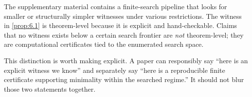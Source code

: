 The supplementary material contains a finite-search pipeline that looks for
smaller or structurally simpler witnesses under various restrictions. The
witness in \cref{prop:6.1} is theorem-level because it is explicit and
hand-checkable. Claims that no witness exists below a certain search frontier
are \emph{not} theorem-level; they are computational certificates tied to the
enumerated search space.

This distinction is worth making explicit. A paper can responsibly say ``here is an explicit
witness we know'' and separately say ``here is a reproducible finite
certificate supporting minimality within the searched regime.'' It should not
blur those two statements together.